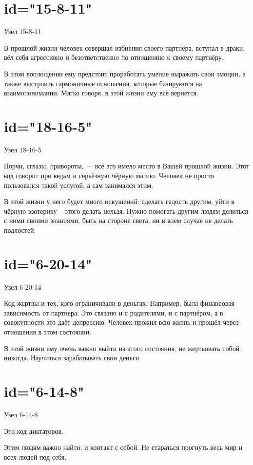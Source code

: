 \section{id="15-8-11"}{Узел 15-8-11}
\item В прошлой жизни человек совершал избиения своего партнёра, вступал в драки, вёл себя агрессивно и безответственно по отношению к своему партнёру.
\item В этом воплощении ему предстоит проработать умение выражать свои эмоции, а также выстроить гармоничные отношения, которые базируются на взаимопонимании. Мягко говоря, в этой жизни ему всё вернется.
\endsection

\section{id="18-16-5"}{Узел 18-16-5}
\item Порчи, сглазы, привороты, — всё это имело место в Вашей прошлой жизни. Этот код говорит про ведьм и серьёзную чёрную магию. Человек не просто пользовался такой услугой, а сам занимался этим.
\item В этой жизни у него будет много искушений: сделать гадость другим, уйти в чёрную эзотерику – этого делать нельзя. Нужно помогать другим людям делиться с ними своими знаниями, быть на стороне света, ни в коем случае не делать подлостей.
\endsection

\section{id="6-20-14"}{Узел 6-20-14}
\item Код жертвы и тех, кого ограничивали в деньгах. Например, была финансовая зависимость от партнера. Это связано и с родителями, и с партнёром, а в совокупности это даёт депрессию. Человек прожил всю жизнь и прошёл через отношения в этом состоянии.
\item В этой жизни ему очень важно выйти из этого состояния, не жертвовать собой никогда. Научиться зарабатывать свои деньги.
\endsection

\section{id="6-14-8"}{Узел 6-14-8}
\item Это код диктаторов.
\item Этим людям важно найти, и контакт с собой. Не стараться прогнуть весь мир и всех людей под себя.
\endsection

